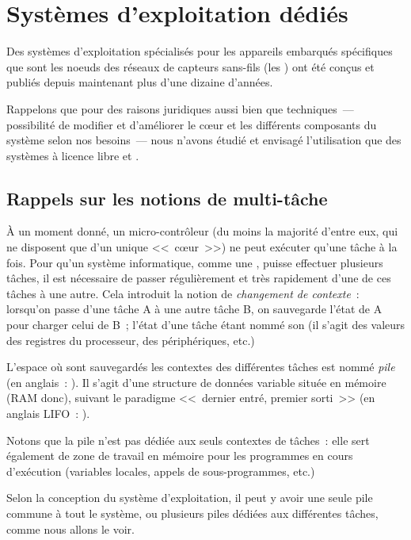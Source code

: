
\section{Systèmes d'exploitation dédiés}
\label{SecOSWSN}

Des systèmes d'exploitation spécialisés pour les appareils embarqués
spécifiques que sont les noeuds des réseaux de capteurs sans-fils
(les ) ont été conçus et publiés depuis maintenant
plus d'une dizaine d'années.

Rappelons que pour des raisons juridiques aussi bien que techniques~---
possibilité de modifier et d'améliorer le c{\oe}ur et les différents
composants du système selon nos besoins~--- nous n'avons étudié et
envisagé l'utilisation que des systèmes à licence libre et .

\subsection{Rappels sur les notions de multi-tâche}
\label{SubsecMultitache}

\`A un moment donné, un micro-contrôleur (du moins la majorité d'entre eux,
qui ne disposent que d'un unique <<~c{\oe}ur~>>) ne peut exécuter qu'une
tâche à la fois. Pour qu'un système informatique, comme une ,
puisse effectuer plusieurs tâches, il est nécessaire de passer régulièrement
et très rapidement d'une de ces tâches à une autre. Cela introduit la notion
de \emph{changement de contexte}~: lorsqu'on passe d'une tâche A à une
autre tâche B, on sauvegarde l'état de A pour charger celui de B~;
l'état d'une tâche étant nommé son  (il s'agit des valeurs
des registres du processeur, des périphériques, etc.)

L'espace où sont sauvegardés les contextes des différentes tâches est nommé
\emph{pile} (en anglais~: ). Il s'agit d'une structure
de données variable située en mémoire (RAM donc), suivant le paradigme
<<~dernier entré, premier sorti~>> (en anglais LIFO~: ).

Notons que la pile n'est pas dédiée aux seuls contextes de tâches~:
elle sert également de zone de travail en mémoire pour les programmes
en cours d'exécution (variables locales, appels de sous-programmes, etc.)

Selon la conception du système d'exploitation, il peut y avoir une seule
pile commune à tout le système, ou plusieurs piles dédiées aux différentes
tâches, comme nous allons le voir.

